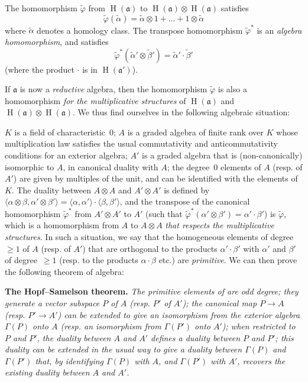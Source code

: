 \documentclass{article}
\newcommand{\fk}{\mathfrak}
\renewcommand{\geq}{\geqslant}
\DeclareMathOperator{\HH}{H}
\newcommand{\oldpage}[1]{\marginpar{\footnotesize$\Big\vert$ \textit{p.~#1}}}
\begin{document}
The homomorphism $\widetilde{\varphi}$ from $\HH(\fk{a})$ to $\HH(\fk{a})\otimes\HH(\fk{a})$ satisfies
\[
  \widetilde{\varphi}(\widetilde{\alpha})
  = \widetilde{\alpha}\otimes1 + \ldots + 1\otimes\widetilde{\alpha}
\]
where $\widetilde{\alpha}$ denotes a homology class.
The transpose homomorphism $\widetilde{\varphi}^*$ is an \emph{algebra homomorphism}, and satisfies
\[
  \widetilde{\varphi}^*(\widetilde{\alpha}'\otimes\widetilde{\beta}')
  = \widetilde{\alpha}'\cdot\widetilde{\beta}'
\]
(where the product $\cdot$ is in $\HH(\fk{a}')$).

If $\fk{a}$ is now a \emph{reductive} algebra, then the homomorphism $\widetilde{\varphi}$ is also a homomorphism \emph{for the multiplicative structures} of $\HH(\fk{a})$ and $\HH(\fk{a})\otimes\HH(\fk{a})$.
\oldpage{51}
We thus find ourselves in the following algebraic situation:

$K$ is a field of characteristic~$0$;
$A$ is a graded algebra of finite rank over $K$ whose multiplication law satisfies the usual commutativity and anticommutativity conditions for an exterior algebra;
$A'$ is a graded algebra that is (non-canonically) isomorphic to $A$, in canonical duality with $A$;
the degree~$0$ elements of $A$ (resp. of $A'$) are given by multiples of the unit, and can be identified with the elements of $K$.
The duality between $A\otimes A$ and $A'\otimes A'$ is defined by $\langle\alpha\otimes\beta,\alpha'\otimes\beta'\rangle = \langle\alpha,\alpha'\rangle\cdot\langle\beta,\beta'\rangle$, and the transpose of the canonical homomorphism $\widetilde{\varphi}^*$ from $A'\otimes A'$ to $A'$ (such that $\widetilde{\varphi}^*(\alpha'\otimes\beta')=\alpha'\cdot\beta'$) is $\widetilde{\varphi}$, which is a homomorphism from $A$ to $A\otimes A$ \emph{that respects the multiplicative structures}.
In such a situation, we say that the homogeneous elements of degree~$\geq1$ of $A$ (resp. of $A'$) that are orthogonal to the products $\alpha'\cdot\beta'$ with $\alpha'$ and $\beta'$ of degree~$\geq1$ (resp. to the products $\alpha\cdot\beta$ etc.) are \emph{primitive}.
We can then prove the following theorem of algebra:

\medskip
\textbf{The Hopf--Samelson theorem.}
{\itshape
  The \emph{primitive} elements of are \emph{odd degree};
  they generate a vector subspace $P$ of $A$ (resp. $P'$ of $A'$);
  the canonical map $P\to A$ (resp. $P'\to A'$) can be extended to give an \emph{isomorphism from the exterior algebra $\Gamma(P)$ onto $A$} (resp. an isomorphism from $\Gamma(P')$ onto $A'$);
  when restricted to $P$ and $P'$, the duality between $A$ and $A'$ defines a duality between $P$ and $P'$;
  this duality can be extended in the usual way to give a duality between $\Gamma(P)$ and $\Gamma(P')$ that, by identifying $\Gamma(P)$ with $A$, and $\Gamma(P')$ with $A'$, recovers the existing duality between $A$ and $A'$.
}
\end{document}
